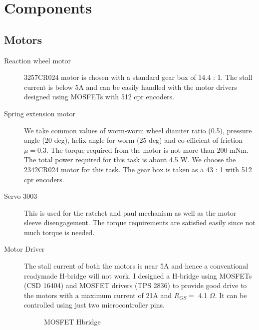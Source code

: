 \section{Components}
\subsection*{Motors}
\begin{description}
 \item[\textsf{Reaction wheel motor}]
  3257CR024 motor is chosen with a standard gear box of 14.4 : 1. The stall current is below 5A and can be easily handled with the motor drivers designed using MOSFETs with 512 cpr encoders.
  \item[\textsf{Spring extension motor}]
  We take common values of worm-worm wheel diamter ratio (0.5), pressure angle (20 deg), helix angle for 
  worm (25 deg) and co-efficient of friction $\mu = 0.3$. The torque required from the motor is not more 
  than 200 mNm. The total power required for this task is about 4.5 W. We choose the 2342CR024 motor 
  for this task. The gear box is taken as a 43 : 1 with 512 cpr encoders.
  \item[\textsf{Servo 3003}]
  This is used for the ratchet and paul mechanism as well as the motor sleeve disengagement. The torque requirements are satisfied easily since not much torque is needed.
  \item[\textsf{Motor Driver}]
  The stall current of both the motors is near 5A and hence a conventional readymade H-bridge will not work. I designed a H-bridge using MOSFETs (CSD 16404) and MOSFET drivers (TPS 2836) to provide good drive to the motors with a maximum current of 21A and $R_{GS} =$ 4.1 $\Omega$. It can be controlled using just two microcontroller pins.
  \begin{figure}[H]
  \centering
  \caption{MOSFET Hbridge}
  \label{fig:3_hbridge}
  \end{figure}
  \end{description}

